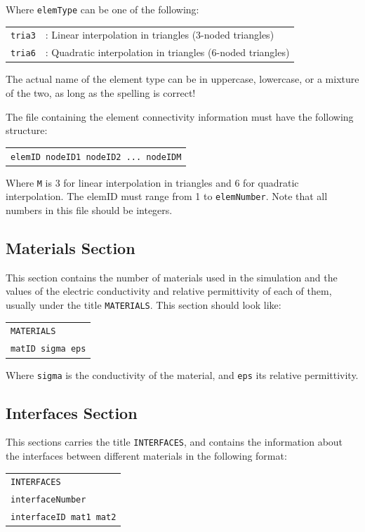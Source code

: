 \documentclass[12pt]{article}
\begin{document}
Where \verb+elemType+ can be one of the following:

\begin{tabular}{ll}
\texttt{tria3}&: Linear interpolation in triangles (3-noded triangles)\\
\texttt{tria6}&: Quadratic interpolation in triangles (6-noded triangles)
\end{tabular}

The actual name of the element type can be in uppercase, lowercase, or a mixture of the two, as long as the spelling is correct!

The file containing the element connectivity information must have the following structure:

\begin{tabular}{l}
\texttt{elemID nodeID1 nodeID2	... nodeIDM}
\end{tabular}

Where \verb+M+ is 3 for linear interpolation in triangles and 6 for quadratic interpolation. The elemID must range from 1 to \verb+elemNumber+. Note that all numbers in this file should be integers.

\subsection{Materials Section}
This section contains the number of materials used in the simulation and the values of the electric conductivity and relative permittivity of each of them, usually under the title \verb+MATERIALS+. This section should look like:

\begin{tabular}{l}
\texttt{MATERIALS}\\
\texttt{matID sigma eps}
\end{tabular}

Where \verb+sigma+ is the conductivity of the material, and \verb+eps+ its relative permittivity.

\subsection{Interfaces Section}
This sections carries the title \verb+INTERFACES+, and contains the information about the interfaces between different materials in the following format:

\begin{tabular}{l}
\texttt{INTERFACES}\\
\texttt{interfaceNumber}\\
\texttt{interfaceID mat1 mat2}\\
\end{tabular}
\end{document}
